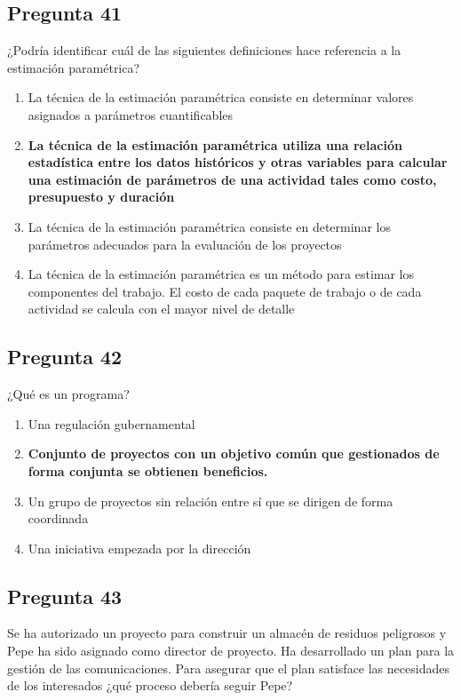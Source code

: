 \documentclass[11pt,a4paper]{article}
\begin{document}
\subsection*{Pregunta 41}
¿Podría identificar cuál de las siguientes definiciones hace referencia a la estimación paramétrica?

\begin{enumerate}[label=\alph*)]
  \item La técnica de la estimación paramétrica consiste en determinar valores asignados a parámetros cuantificables
  \item \textbf{La técnica de la estimación paramétrica utiliza una relación estadística entre los datos históricos y otras variables para calcular una estimación de parámetros de una actividad tales como costo, presupuesto y duración}
  \item La técnica de la estimación paramétrica consiste en determinar los parámetros adecuados para la evaluación de los proyectos
  \item La técnica de la estimación paramétrica es un método para estimar los componentes del trabajo. El costo de cada paquete de trabajo o de cada actividad se calcula con el mayor nivel de detalle
\end{enumerate}

\subsection*{Pregunta 42}
¿Qué es un programa?

\begin{enumerate}[label=\alph*)]
  \item Una regulación gubernamental
  \item \textbf{Conjunto de proyectos con un objetivo común que gestionados de forma conjunta se obtienen beneficios.}
  \item Un grupo de proyectos sin relación entre sí que se dirigen de forma coordinada
  \item Una iniciativa empezada por la dirección
\end{enumerate}

\subsection*{Pregunta 43}
Se ha autorizado un proyecto para construir un almacén de residuos peligrosos y Pepe ha sido asignado como director de proyecto. Ha desarrollado un plan para la gestión de las comunicaciones. Para asegurar que el plan satisface las necesidades de los interesados ¿qué proceso debería seguir Pepe?
\end{document}
